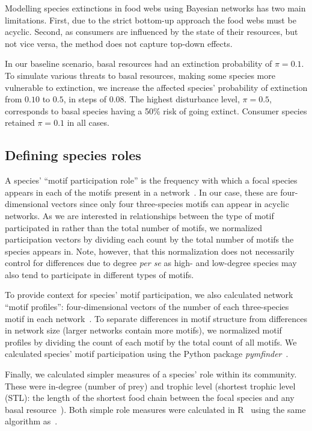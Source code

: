 \documentclass[12pt]{article}
\begin{document}
\begin{spacing}{2.0}
		
		Modelling species extinctions in food webs using Bayesian networks has two main limitations. First, due to the strict bottom-up approach the food webs must be acyclic. 
		Second, as consumers are influenced by the state of their resources, but not vice versa, the method does not capture top-down effects.
		
        In our baseline scenario, basal resources had an extinction probability of $\pi = 0.1$. 
		To simulate various threats to basal resources, making some species more vulnerable to extinction, we increase the affected species' probability of extinction from $0.10$ to $0.5$, in steps of $0.08$. 
		The highest disturbance level, $\pi = 0.5$, corresponds to basal species having a 50\% risk of going extinct. 
		Consumer species retained $\pi=0.1$ in all cases.
		
		
	\subsection*{Defining species roles}

        A species' ``motif participation role'' is the frequency with which a focal species appears in each of the motifs present in a network~\citep{Stouffer2012}.
        In our case, these are four-dimensional vectors since only four three-species motifs can appear in acyclic networks.
        As we are interested in relationships between the type of motif participated in rather than the total number of motifs, we normalized participation vectors by dividing each count by the total number of motifs the species appears in.
        Note, however, that this normalization does not necessarily control for differences due to degree \emph{per se} as high- and low-degree species may also tend to participate in different types of motifs.
        
        
        To provide context for species' motif participation, we also calculated network ``motif profiles'': four-dimensional vectors of the number of each three-species motif in each network~\citep{Stouffer2012}.
        To separate differences in motif structure from differences in network size (larger networks contain more motifs), we normalized motif profiles by dividing the count of each motif by the total count of all motifs. 
		We calculated species' motif participation using the Python package \emph{pymfinder}~\citep{pymfinder}.


        Finally, we calculated simpler measures of a species' role within its community.
        These were in-degree (number of prey) and trophic level (shortest trophic level (STL): the length of the shortest food chain between the focal species and any basal resource~\citep{Williams2004}).
        Both simple role measures were calculated in R~\citep{R} using the same algorithm as~\citet{Eklof2013}.
        



\end{spacing}
\end{document}
